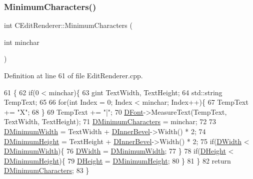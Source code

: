 \subsubsection{\texorpdfstring{Minimum\+Characters()}{MinimumCharacters()}\hspace{0.1cm}{\footnotesize\ttfamily [2/2]}}
{\footnotesize\ttfamily int C\+Edit\+Renderer\+::\+Minimum\+Characters (\begin{DoxyParamCaption}\item[{int}]{minchar }\end{DoxyParamCaption})}



Definition at line 61 of file Edit\+Renderer.\+cpp.


\begin{DoxyCode}
61                                                \{
62     \textcolor{keywordflow}{if}(0 < minchar)\{
63         gint TextWidth, TextHeight;
64         std::string TempText;
65         
66         \textcolor{keywordflow}{for}(\textcolor{keywordtype}{int} Index = 0; Index < minchar; Index++)\{
67             TempText += \textcolor{stringliteral}{"X"};
68         \}
69         TempText += \textcolor{stringliteral}{"|"};
70         \hyperlink{classCEditRenderer_afd108ae6cb3e9eeffce881a1ada0f0db}{DFont}->MeasureText(TempText, TextWidth, TextHeight);    
71         \hyperlink{classCEditRenderer_ae5d0bd249b2d483c361b0bf9c16c15d3}{DMinimumCharacters} = minchar;
72     
73         \hyperlink{classCEditRenderer_aba068f1e6d267e5ac0ed5752304133e8}{DMinimumWidth} = TextWidth + \hyperlink{classCEditRenderer_a45b1bf4e9aebe3811c15df1018b8d8da}{DInnerBevel}->Width() * 2;
74         \hyperlink{classCEditRenderer_a9e063123747e147ef1c35bd962205fbd}{DMinimumHeight} = TextHeight + \hyperlink{classCEditRenderer_a45b1bf4e9aebe3811c15df1018b8d8da}{DInnerBevel}->Width() * 2;
75         \textcolor{keywordflow}{if}(\hyperlink{classCEditRenderer_ab203e5083f61d3575eb491f170c21d45}{DWidth} < \hyperlink{classCEditRenderer_aba068f1e6d267e5ac0ed5752304133e8}{DMinimumWidth})\{
76             \hyperlink{classCEditRenderer_ab203e5083f61d3575eb491f170c21d45}{DWidth} = \hyperlink{classCEditRenderer_aba068f1e6d267e5ac0ed5752304133e8}{DMinimumWidth};   
77         \}
78         \textcolor{keywordflow}{if}(\hyperlink{classCEditRenderer_ade8dedb4f9790d28b38da8ef20a171cb}{DHeight} < \hyperlink{classCEditRenderer_a9e063123747e147ef1c35bd962205fbd}{DMinimumHeight})\{
79             \hyperlink{classCEditRenderer_ade8dedb4f9790d28b38da8ef20a171cb}{DHeight} = \hyperlink{classCEditRenderer_a9e063123747e147ef1c35bd962205fbd}{DMinimumHeight};   
80         \}
81     \}
82     \textcolor{keywordflow}{return} \hyperlink{classCEditRenderer_ae5d0bd249b2d483c361b0bf9c16c15d3}{DMinimumCharacters};
83 \}
\end{DoxyCode}
\hypertarget{classCEditRenderer_adcb8ea0811710a16181f4caa4c5bb075}{}\label{classCEditRenderer_adcb8ea0811710a16181f4caa4c5bb075} 
